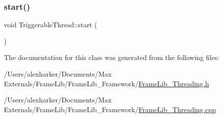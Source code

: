\mbox{\label{class_triggerable_thread_acda64886ceb38f18168d4af4c27391ed}} 
\subsubsection{\texorpdfstring{start()}{start()}}
{\footnotesize\ttfamily void Triggerable\+Thread\+::start (\begin{DoxyParamCaption}{ }\end{DoxyParamCaption})\hspace{0.3cm}{\ttfamily [inline]}}



The documentation for this class was generated from the following files\+:\begin{DoxyCompactItemize}
\item 
/\+Users/alexharker/\+Documents/\+Max Externals/\+Frame\+Lib/\+Frame\+Lib\+\_\+\+Framework/\hyperlink{_frame_lib___threading_8h}{Frame\+Lib\+\_\+\+Threading.\+h}\item 
/\+Users/alexharker/\+Documents/\+Max Externals/\+Frame\+Lib/\+Frame\+Lib\+\_\+\+Framework/\hyperlink{_frame_lib___threading_8cpp}{Frame\+Lib\+\_\+\+Threading.\+cpp}\end{DoxyCompactItemize}
